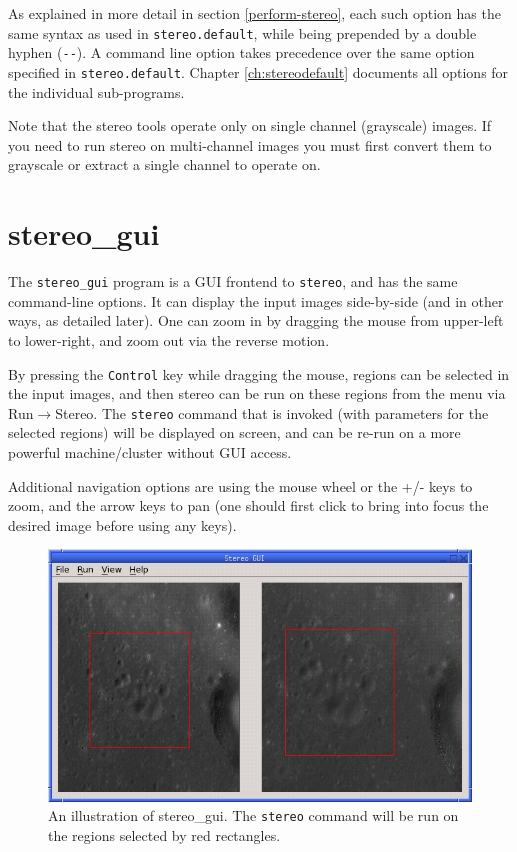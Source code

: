 As explained in more detail
in section \ref{perform-stereo}, each such option has the same syntax as
used in \texttt{stereo.default}, while being prepended by a double hyphen
(\texttt{-\/-}).  A command line option takes precedence over the same
option specified in \texttt{stereo.default}. Chapter \ref{ch:stereodefault}
documents all options for the individual sub-programs.

Note that the stereo tools operate only on single channel (grayscale) images.
If you need to run stereo on multi-channel images you must first convert them
to grayscale or extract a single channel to operate on.

\section{stereo\_gui}
\label{stereo_gui}

The \texttt{stereo\_gui} program is a GUI frontend to \texttt{stereo},
and has the same command-line options. It can display the input images
side-by-side (and in other ways, as detailed later). One can zoom in by
dragging the mouse from upper-left to lower-right, and zoom out via the
reverse motion.

By pressing the \texttt{Control} key while dragging the mouse, regions
can be selected in the input images, and then stereo can be run on these
regions from the menu via Run$\rightarrow$Stereo. The \texttt{stereo}
command that is invoked (with parameters for the selected regions) will
be displayed on screen, and can be re-run on a more powerful
machine/cluster without GUI access.

Additional navigation options are using the mouse wheel or the +/- keys to
zoom, and the arrow keys to pan (one should first click to bring into
focus the desired image before using any keys).

\begin{figure}[h!]
\begin{center}
\includegraphics[width=5in]{images/stereo_gui.jpg}
\caption[asp\_gui]{An illustration of stereo\_gui. The \texttt{stereo} command
will be run on the regions selected by red rectangles.}
\label{asp_gui_fig}
\end{center}
\end{figure}

